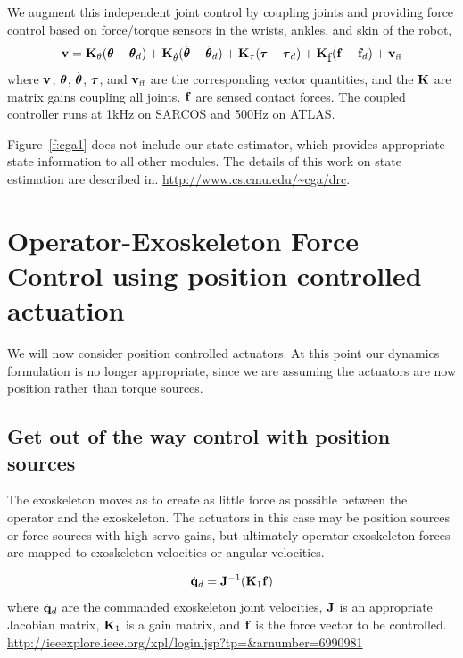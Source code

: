 \documentclass[letterpaper,12pt,fullpage]{article}
\newcommand{\ff}{{\mbox {\tiny ff}}}
\begin{document}
We augment this independent joint control by coupling joints
and providing force control based on force/torque sensors in the wrists,
ankles, and skin of the robot,
\begin{equation}
\vv = \mK_{\theta} ( \vtheta - \vtheta_{d} )
+ \mK_{\dot{\theta}} ( \dot{\vtheta} - \dot{\vtheta}_{d} )
+ \mK_{\tau} ( \vtau - \vtau_{d} )
+ \mK_{\mbox{f}} ( \vf - \vf_{d} ) 
+ \vv_{\ff}
\end{equation}
where ${\bf v}$, $\vtheta$, $\dot{\vtheta}$, $\vtau$, and $\vv_{\ff}$
are the corresponding vector quantities, and the ${\bf K}$ are matrix gains
coupling all joints. ${\bf f}$ are sensed contact forces.
The coupled controller runs at 1kHz on SARCOS and 500Hz on ATLAS.

Figure~\ref{f:cga1} does not include our state estimator, which provides
appropriate state information to all other modules. The details of this work on state estimation are
described in.
\url{http://www.cs.cmu.edu/~cga/drc}.

\section{Operator-Exoskeleton Force Control using position controlled actuation}

We will now consider position controlled actuators.
At this point our dynamics formulation is no longer appropriate, since we
are assuming the actuators are now position rather than torque sources.

\subsection{Get out of the way control with position sources}

The exoskeleton moves as to create as little force as possible between the
operator and the exoskeleton. The actuators in this case may be position sources or
force sources with high servo gains,
but ultimately operator-exoskeleton forces are mapped
to exoskeleton velocities or angular velocities.

\begin{equation}
\dot{{\bf q}}_d = {\bf J}^{-1} ({\bf K}_1 {\bf f})
\label{eq:gootwcps}
\end{equation}
where $\dot{{\bf q}}_d$ are the commanded exoskeleton joint velocities,
${\bf J}$ is an appropriate Jacobian matrix, ${\bf K}_1$ is a gain matrix,
and ${\bf f}$ is the force vector to be controlled.\\
\url{http://ieeexplore.ieee.org/xpl/login.jsp?tp=&arnumber=6990981}
\end{document}
